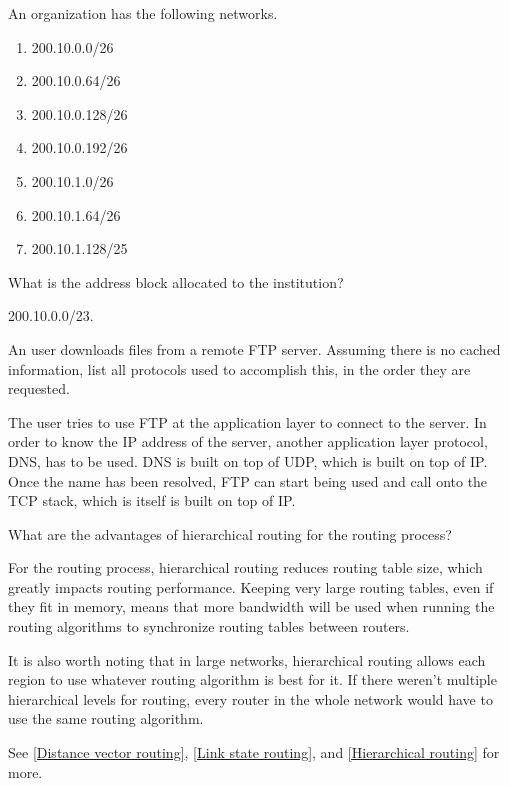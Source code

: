 \begin{Exercise}
An organization has the following networks.
\begin{enumerate}
    \item 200.10.0.0/26
    \item 200.10.0.64/26
    \item 200.10.0.128/26
    \item 200.10.0.192/26
    \item 200.10.1.0/26
    \item 200.10.1.64/26
    \item 200.10.1.128/25
\end{enumerate}
What is the address block allocated to the institution?
\end{Exercise}
\begin{Answer}
200.10.0.0/23.
\end{Answer}

\begin{Exercise}
An user downloads files from a remote FTP server.
Assuming there is no cached information, list all protocols used to accomplish this, in the order they are requested.
\end{Exercise}
\begin{Answer}
The user tries to use FTP at the application layer to connect to the server.
In order to know the IP address of the server, another application layer protocol, DNS, has to be used. DNS is built on top of UDP, which is built on top of IP.
Once the name has been resolved, FTP can start being used and call onto the TCP stack, which is itself is built on top of IP.
\end{Answer}

\begin{Exercise}
What are the advantages of hierarchical routing for the routing process?
\end{Exercise}
\begin{Answer}
For the routing process, hierarchical routing reduces routing table size, which greatly impacts routing performance.
Keeping very large routing tables, even if they fit in memory, means that more bandwidth will be used when running the routing algorithms to synchronize routing tables between routers.

It is also worth noting that in large networks, hierarchical routing allows each region to use whatever routing algorithm is best for it.
If there weren't multiple hierarchical levels for routing, every router in the whole network would have to use the same routing algorithm.

See \ref{Distance vector routing}, \ref{Link state routing}, and \ref{Hierarchical routing} for more.
\end{Answer}

